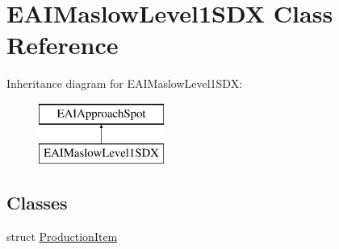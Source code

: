 \hypertarget{class_e_a_i_maslow_level1_s_d_x}{}\section{E\+A\+I\+Maslow\+Level1\+S\+DX Class Reference}
\label{class_e_a_i_maslow_level1_s_d_x}
Inheritance diagram for E\+A\+I\+Maslow\+Level1\+S\+DX\+:\begin{figure}[H]
\begin{center}
\leavevmode
\includegraphics[height=2.000000cm]{dc/db8/class_e_a_i_maslow_level1_s_d_x}
\end{center}
\end{figure}
\subsection*{Classes}
\begin{DoxyCompactItemize}
\item 
struct \mbox{\hyperlink{struct_e_a_i_maslow_level1_s_d_x_1_1_production_item}{Production\+Item}}
\end{DoxyCompactItemize}
